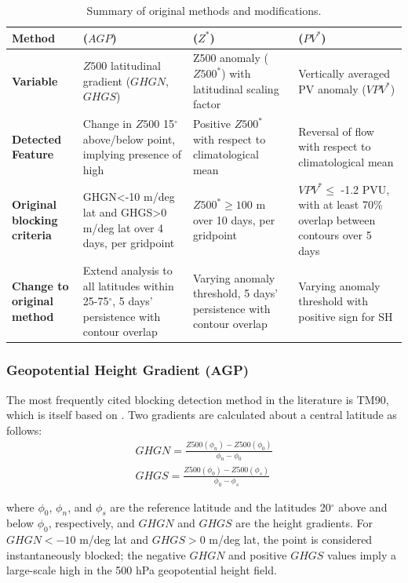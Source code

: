 \documentclass[smallextended]{svjour3}       %
\numberwithin{equation}{section}
\begin{document}
\begin{table}
\caption{Summary of original methods and modifications.} 
\label{tabsum}
\begin{tabular}{|L{0.12\textwidth}|L{0.22\textwidth}|L{0.22\textwidth}|L{0.22\textwidth}|}
\hline
\textbf{Method} &  \textbf{\citealt{tibaldi_operational_1990} ($AGP$)}  & \textbf{\citealt{dole_persistent_1983} ($Z^*$)}  &
\textbf{\citealt{schwierz_perspicacious_2004} ($PV^*$)}  \\ \hline
\textbf{Variable} &  $Z500$ latitudinal gradient ($GHGN$, $GHGS$) &
Z500 anomaly ($Z500^*$) with latitudinal scaling factor 
& Vertically averaged PV anomaly ($VPV^*$) \\ \hline
\textbf{Detected Feature}  & Change in $Z500$ 15$^\circ$ above/below point, implying presence of high  
& Positive $Z500^*$ with respect to climatological mean 
& Reversal of flow with respect to climatological mean\\ \hline
\textbf{Original blocking criteria}   & GHGN\textless-10 m/deg lat and GHGS\textgreater0 m/deg lat over 4 days, per gridpoint  
& $Z500^*\geq 100$ m over 10 days, per gridpoint                        
& $VPV^*\leq$ -1.2 PVU, with at least 70\% overlap between contours over 5 days \\ \hline
\textbf{Change to original method}   & Extend analysis to all latitudes within 25-75$^{\circ}$, 5 days' persistence with contour overlap
& Varying anomaly threshold, 5 days' persistence with contour overlap
& Varying anomaly threshold with positive sign for SH \\ \hline
\end{tabular}
\end{table}

\subsubsection{Geopotential Height Gradient (AGP)}\label{ghgdef}

The most frequently cited blocking detection method in the literature is TM90, which is itself based on \cite{lejenas_characteristics_1983}. Two gradients are calculated about a central latitude as follows:
\begin{eqnarray}
GHGN=\frac{Z500(\phi_n)-Z500(\phi_0)}{\phi_n-\phi_0}\\
GHGS=\frac{Z500(\phi_0)-Z500(\phi_s)}{\phi_0-\phi_s}
\end{eqnarray}

\noindent
where $\phi_0$, $\phi_n$, and $\phi_s$ are the reference latitude and the latitudes 20$^\circ$ above and below $\phi_0$, respectively, and $GHGN$ and $GHGS$ are the height gradients. For $GHGN<-10$ m/deg lat and $GHGS>0$ m/deg lat, the point is considered instantaneously blocked; the negative $GHGN$ and positive $GHGS$ values imply a large-scale high in the 500 hPa geopotential height field.
\end{document}
